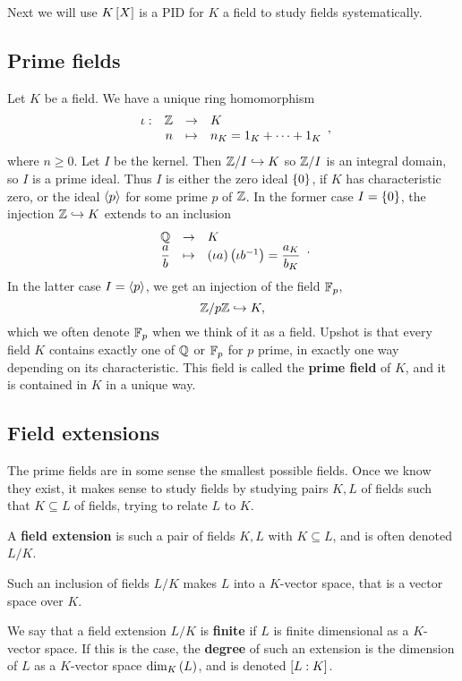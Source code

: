 
Next we will use $ K\sb{X} $ is a PID for $ K $ a field to study fields systematically.

\subsection{Prime fields}

Let $ K $ be a field. We have a unique ring homomorphism
$$ \function[\iota]{\Z}{K}{n}{n_K = 1_K + \dots + 1_K}, $$
where $ n \ge 0 $. Let $ I $ be the kernel. Then $ \Z / I \hookrightarrow K $ so $ \Z / I $ is an integral domain, so $ I $ is a prime ideal. Thus $ I $ is either the zero ideal $ \cb{0} $, if $ K $ has characteristic zero, or the ideal $ \ab{p} $ for some prime $ p $ of $ \Z $. In the former case $ I = \cb{0} $, the injection $ \Z \hookrightarrow K $ extends to an inclusion
$$ \function{\Q}{K}{\dfrac{a}{b}}{\rb{\iota a}\rb{\iota b^{-1}} = \dfrac{a_K}{b_K}}. $$
In the latter case $ I = \ab{p} $, we get an injection of the field $ \F_p $,
$$ \Z / p\Z \hookrightarrow K, $$
which we often denote $ \F_p $ when we think of it as a field. Upshot is that every field $ K $ contains exactly one of $ \Q $ or $ \F_p $ for $ p $ prime, in exactly one way depending on its characteristic. This field is called the \textbf{prime field} of $ K $, and it is contained in $ K $ in a unique way.

\subsection{Field extensions}

The prime fields are in some sense the smallest possible fields. Once we know they exist, it makes sense to study fields by studying pairs $ K, L $ of fields such that $ K \subseteq L $ of fields, trying to relate $ L $ to $ K $.

\begin{definition}
A \textbf{field extension} is such a pair of fields $ K, L $ with $ K \subseteq L $, and is often denoted $ L / K $.
\end{definition}

\begin{note*}
Such an inclusion of fields $ L / K $ makes $ L $ into a $ K $-vector space, that is a vector space over $ K $.
\end{note*}

\begin{definition}
We say that a field extension $ L / K $ is \textbf{finite} if $ L $ is finite dimensional as a $ K $-vector space. If this is the case, the \textbf{degree} of such an extension is the dimension of $ L $ as a $ K $-vector space $ \dim_K\rb{L} $, and is denoted $ \sb{L : K} $.
\end{definition}

